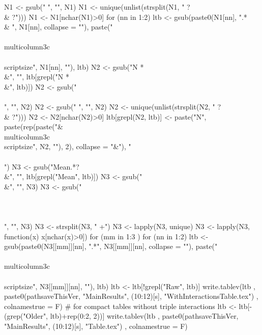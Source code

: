 \begin{Schunk}
\begin{Sinput}
{  N1 <- gsub(" ", "", N1)
  N1 <- unique(unlist(strsplit(N1, " ?\\& ?")))
  N1 <- N1[nchar(N1)>0]
  for (nn in 1:2) 
    ltb <- gsub(paste0(N1[nn], ".*\\& ", N1[nn], collapse = ""), 
      paste("\\\\multicolumn{3}{c}{\\\\scriptsize", N1[nn], "}"), ltb)
  N2 <- gsub("N *\\&", "", ltb[grepl("N *\\&", ltb)])
  N2 <- gsub("\\\\", "", N2)
  N2 <- gsub(" ", "", N2)
  N2 <- unique(unlist(strsplit(N2, " ?\\& ?")))
  N2 <- N2[nchar(N2)>0]
  ltb[grepl(N2, ltb)] <- 
    paste("N", paste(rep(paste("& \\multicolumn{3}{c}{\\scriptsize",  N2, "}"), 2), collapse = "&"), "\\\\")
  N3 <- gsub("Mean.*?\\&", "", ltb[grepl("Mean", ltb)])
  N3 <- gsub("\\&", "", N3)
  N3 <- gsub("\\\\\\\\", "", N3)
  N3 <- strsplit(N3, " +")
  N3 <- lapply(N3, unique)
  N3 <- lapply(N3, function(x) x[nchar(x)>0])
  for (mm in 1:3 )
    for (nn in 1:2) 
      ltb <- gsub(paste0(N3[[mm]][nn], ".*", N3[[mm]][nn], collapse = ""), 
        paste("\\\\multicolumn{3}{c}{\\\\scriptsize", N3[[mm]][nn], "}"), ltb)
  ltb <- ltb[!grepl("Raw", ltb)]
  write.tablev(ltb
    ,  paste0(pathsaveThisVer, "MainResults", (10:12)[s], "WithInteractionsTable.tex")
    ,  colnamestrue = F)
  # for compact tables without triple interactions
  ltb <- ltb[-(grep("Older", ltb)+rep(0:2, 2))]
  write.tablev(ltb
    ,  paste0(pathsaveThisVer, "MainResults", (10:12)[s], "Table.tex")
    ,  colnamestrue = F)
}
\end{Sinput}
\end{Schunk}

